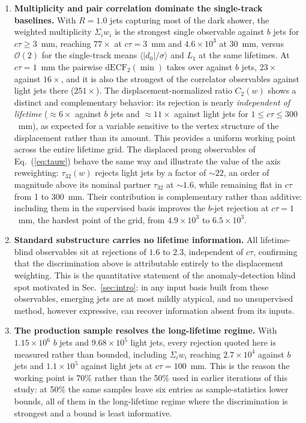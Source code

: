 \documentclass[a4paper,11pt]{article}
\newcommand{\dnought}{d_0}
\newcommand{\ctau}{c\tau}
\begin{document}
\begin{enumerate}
  \item \textbf{Multiplicity and pair correlation dominate the
  single-track baselines.} With $R = 1.0$ jets capturing most of the
  dark shower, the weighted multiplicity $\Sigma_i w_i$ is the
  strongest single observable against $b$ jets for $\ctau \geq 3$~mm,
  reaching $77\times$ at $\ctau = 3$~mm and $4.6\times 10^3$ at
  30~mm, versus $\mathcal{O}(2)$ for the single-track means
  $\langle|\dnought|/\sigma\rangle$ and $L_1$ at the same
  lifetimes. At $\ctau = 1$~mm the pairwise $\mathrm{dECF}_2(\min)$
  takes over against $b$ jets, $23\times$ against $16\times$, and it
  is also the strongest of the correlator observables against light
  jets there ($251\times$). The displacement-normalized ratio $C_2(w)$
  shows a distinct and complementary behavior: its rejection is nearly
  \emph{independent of lifetime} ($\approx 6\times$ against $b$ jets
  and $\approx 11\times$ against light jets
  for $1 \le \ctau \le 300$~mm), as expected for a variable sensitive
  to the vertex structure of the displacement rather than its amount.
  This provides a uniform working point across the entire lifetime
  grid. The displaced prong observables of Eq.~(\ref{eq:tauw}) behave
  the same way and illustrate the value of the axis reweighting:
  $\tau_{32}(w)$ rejects light jets by a factor of $\sim 22$, an order
  of magnitude above its nominal partner $\tau_{32}$ at $\sim 1.6$, while
  remaining flat in $\ctau$ from 1 to 300~mm. Their contribution is
  complementary rather than additive: including them in the supervised
  basis improves the $b$-jet rejection at $\ctau = 1$~mm, the hardest
  point of the grid, from $4.9\times 10^3$ to $6.5\times 10^3$.
  \item \textbf{Standard substructure carries no lifetime information.}
  All lifetime-blind observables sit at rejections of $1.6$ to $2.3$,
  independent of $\ctau$, confirming that the discrimination above is
  attributable entirely to the displacement weighting. This is the
  quantitative statement of the anomaly-detection blind spot motivated
  in Sec.~\ref{sec:intro}: in any input basis built from these
  observables, emerging jets are at most mildly atypical, and no
  unsupervised method, however expressive, can recover
  information absent from its inputs.
  \item \textbf{The production sample resolves the long-lifetime
  regime.} With $1.15\times 10^6$ $b$ jets and $9.68\times 10^5$ light
  jets, every rejection quoted here is measured rather than bounded,
  including $\Sigma_i w_i$ reaching $2.7\times 10^4$ against $b$ jets
  and $1.1\times 10^5$ against light jets at $\ctau = 100$~mm. This
  is the reason the working point is 70\% rather than the 50\% used
  in earlier iterations of this study: at 50\% the same samples leave
  six entries as sample-statistics lower bounds, all of them in the
  long-lifetime regime where the discrimination is strongest and a
  bound is least informative.
\end{enumerate}
\end{document}
